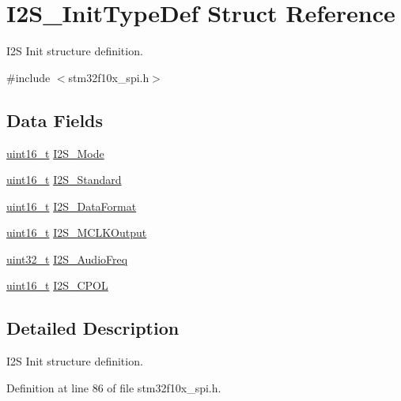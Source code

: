 \hypertarget{struct_i2_s___init_type_def}{\section{I2\-S\-\_\-\-Init\-Type\-Def Struct Reference}
\label{struct_i2_s___init_type_def}
}


I2\-S Init structure definition.  




{\ttfamily \#include $<$stm32f10x\-\_\-spi.\-h$>$}

\subsection*{Data Fields}
\begin{DoxyCompactItemize}
\item 
\hyperlink{stdint_8h_a273cf69d639a59973b6019625df33e30}{uint16\-\_\-t} \hyperlink{struct_i2_s___init_type_def_aa57e5190eac245c0873a00849b1bd239}{I2\-S\-\_\-\-Mode}
\item 
\hyperlink{stdint_8h_a273cf69d639a59973b6019625df33e30}{uint16\-\_\-t} \hyperlink{struct_i2_s___init_type_def_ae987936e7cb9a962ee388c98f8c872b7}{I2\-S\-\_\-\-Standard}
\item 
\hyperlink{stdint_8h_a273cf69d639a59973b6019625df33e30}{uint16\-\_\-t} \hyperlink{struct_i2_s___init_type_def_ad5e59034081427fd638983c10f18e833}{I2\-S\-\_\-\-Data\-Format}
\item 
\hyperlink{stdint_8h_a273cf69d639a59973b6019625df33e30}{uint16\-\_\-t} \hyperlink{struct_i2_s___init_type_def_ae7aaf79b7f392d79ac2f7b35a24e5d1a}{I2\-S\-\_\-\-M\-C\-L\-K\-Output}
\item 
\hyperlink{stdint_8h_a435d1572bf3f880d55459d9805097f62}{uint32\-\_\-t} \hyperlink{struct_i2_s___init_type_def_a87674c5fbccad53b7646565f35d1fc0a}{I2\-S\-\_\-\-Audio\-Freq}
\item 
\hyperlink{stdint_8h_a273cf69d639a59973b6019625df33e30}{uint16\-\_\-t} \hyperlink{struct_i2_s___init_type_def_aeb7741728520734ec2eab95d2143778c}{I2\-S\-\_\-\-C\-P\-O\-L}
\end{DoxyCompactItemize}


\subsection{Detailed Description}
I2\-S Init structure definition. 

Definition at line 86 of file stm32f10x\-\_\-spi.\-h.




